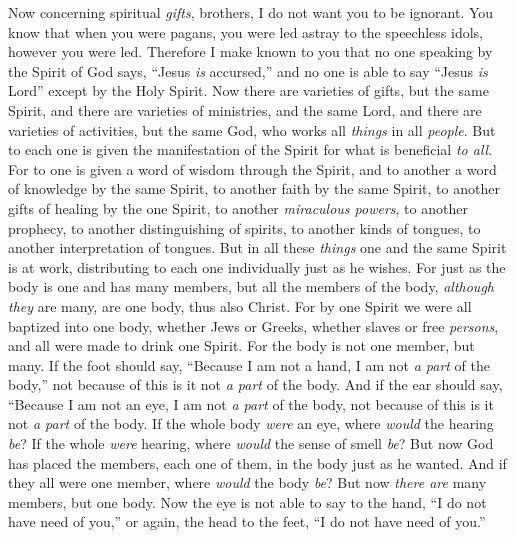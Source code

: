 \begin{biblechapter} %
 Now concerning spiritual \textit{gifts}, brothers, I do not want you to be ignorant.
\verse You know that when you were pagans, you were led astray to the speechless idols, however you were led.
\verse Therefore I make known to you that no one speaking by the Spirit of God says, “Jesus \textit{is} accursed,” and no one is able to say “Jesus \textit{is} Lord” except by the Holy Spirit.
\verse Now there are varieties of gifts, but the same Spirit,
\verse and there are varieties of ministries, and the same Lord,
\verse and there are varieties of activities, but the same God, who works all \textit{things} in all \textit{people}.
\verse But to each one is given the manifestation of the Spirit for what is beneficial \textit{to all}.
\verse For to one is given a word of wisdom through the Spirit, and to another a word of knowledge by the same Spirit,
\verse to another faith by the same Spirit, to another gifts of healing by the one Spirit,
\verse to another \textit{miraculous powers}, to another prophecy, to another distinguishing of spirits, to another kinds of tongues, to another interpretation of tongues.
\verse But in all these \textit{things} one and the same Spirit is at work, distributing to each one individually just as he wishes.
 For just as the body is one and has many members, but all the members of the body, \textit{although they} are many, are one body, thus also Christ.
\verse For by one Spirit we were all baptized into one body, whether Jews or Greeks, whether slaves or free \textit{persons}, and all were made to drink one Spirit.
\verse For the body is not one member, but many.
\verse If the foot should say, “Because I am not a hand, I am not \textit{a part} of the body,” not because of this is it not \textit{a part} of the body.
\verse And if the ear should say, “Because I am not an eye, I am not \textit{a part} of the body, not because of this is it not \textit{a part} of the body.
\verse If the whole body \textit{were} an eye, where \textit{would} the hearing \textit{be}? If the whole \textit{were} hearing, where \textit{would} the sense of smell \textit{be}?
\verse But now God has placed the members, each one of them, in the body just as he wanted.
\verse And if they all were one member, where \textit{would} the body \textit{be}?
\verse But now \textit{there are} many members, but one body.
\verse Now the eye is not able to say to the hand, “I do not have need of you,” or again, the head to the feet, “I do not have need of you.”

\end{biblechapter}
